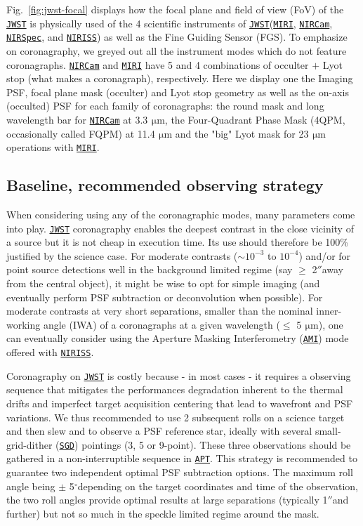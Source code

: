 \documentclass[]{spie}  %
\newcommand{\arcsec}{\mbox{$''$}}
\newcommand{\arcdeg}{\mbox{$^{\circ}$}}
\newcommand{\micron}{$\SI{}{\, \micro\meter}$\xspace}
\newcommand{\jwst}{{\tt \href{https://jwst.stsci.edu}{JWST}}\xspace}
\newcommand{\nircam}{{\tt \href{https://jwst.stsci.edu/instrumentation/nircam}{NIRCam}}\xspace}
\newcommand{\miri}{{\tt \href{https://jwst.stsci.edu/instrumentation/miri}{MIRI}}\xspace}
\newcommand{\niriss}{{\tt \href{https://jwst.stsci.edu/instrumentation/niriss}{NIRISS}}\xspace}
\newcommand{\nirspec}{{\tt \href{https://jwst.stsci.edu/instrumentation/nirspec}{NIRSpec}}\xspace}
\newcommand{\apt}{{\tt \href{http://www.stsci.edu/hst/proposing/apt}{APT}}\xspace}
\newcommand{\ami}{{\tt \href{https://jwst-docs.stsci.edu/display/JTI/NIRISS+Aperture+Masking+Interferometry}{AMI}}\xspace}%
\newcommand{\sgd}{{\tt \href{https://jwst-docs.stsci.edu/display/JTI/NIRCam+Small+Grid+Dithers}{SGD}}\cite{jdox_general}\xspace}%
\begin{document}
Fig.~\ref{fig:jwst-focal} displays how the focal plane and field of view (FoV) of the \jwst is physically used of the 4 scientific instruments of \jwst (\miri, \nircam, \nirspec, and \niriss) as well as the Fine Guiding Sensor (FGS). To emphasize on coronagraphy, we greyed out all the instrument modes which do not feature coronagraphs. \nircam and \miri have 5 and 4 combinations of occulter $+$ Lyot stop (what makes a coronagraph), respectively. Here we display one the Imaging PSF, focal plane mask (occulter) and Lyot stop geometry as well as the on-axis (occulted) PSF for each family of coronagraphs: the round mask and long wavelength bar for \nircam at 3.3\micron, the Four-Quadrant Phase Mask (4QPM, occasionally called FQPM) at 11.4\micron and the "big" Lyot mask for 23\micron operations with \miri. 

\subsection{Baseline, recommended observing strategy}
\label{sec:baseline}

When considering using any of the coronagraphic modes, many parameters come into play. \jwst coronagraphy enables the deepest contrast in the close vicinity of a source but it is not cheap in execution time. Its use should therefore be 100\% justified by the science case. For moderate contrasts ($\sim 10^{-3}$ to $10^{-4}$) and/or for point source detections well in the background limited regime (say $\geqslant$ 2\arcsec away from the central object), it might be wise to opt for simple imaging (and eventually perform PSF subtraction or deconvolution when possible). For moderate contrasts at very short separations, smaller than the nominal inner-working angle (IWA) of a coronagraphs at a given wavelength ($\leqslant$ 5\micron), one can eventually consider using the Aperture Masking Interferometry (\ami) mode\cite{artigau2014_spie_NIRISS_AMI} offered with \niriss.


Coronagraphy on \jwst is costly because - in most cases - it requires a observing sequence that mitigates the performances degradation inherent to the thermal drifts and imperfect target acquisition centering that lead to wavefront and PSF variations. We thus recommended to use 2 subsequent rolls on a science target and then slew and to observe a PSF reference star, ideally with several small-grid-dither (\sgd) pointings  (3, 5 or 9-point). These three observations should be gathered in a non-interruptible sequence in \apt. This strategy is recommended\cite{jdox_recom} to guarantee two independent optimal PSF subtraction options. The maximum roll angle being $\pm$ 5\arcdeg depending on the target coordinates and time of the observation, the two roll angles provide optimal results at large separations (typically 1\arcsec and further) but not so much in the speckle limited regime around the mask.
\end{document}
